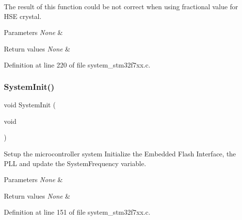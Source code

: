 \begin{DoxyItemize}
\item The result of this function could be not correct when using fractional value for H\+SE crystal.
\end{DoxyItemize}


\begin{DoxyParams}{Parameters}
{\em None} & \\
\hline
\end{DoxyParams}

\begin{DoxyRetVals}{Return values}
{\em None} & \\
\hline
\end{DoxyRetVals}


Definition at line 220 of file system\+\_\+stm32f7xx.\+c.

\mbox{\label{group__STM32F7xx__System__Private__Functions_ga93f514700ccf00d08dbdcff7f1224eb2}} 
\subsubsection{\texorpdfstring{SystemInit()}{SystemInit()}}
{\footnotesize\ttfamily void System\+Init (\begin{DoxyParamCaption}\item[{void}]{ }\end{DoxyParamCaption})}



Setup the microcontroller system Initialize the Embedded Flash Interface, the P\+LL and update the System\+Frequency variable. 


\begin{DoxyParams}{Parameters}
{\em None} & \\
\hline
\end{DoxyParams}

\begin{DoxyRetVals}{Return values}
{\em None} & \\
\hline
\end{DoxyRetVals}


Definition at line 151 of file system\+\_\+stm32f7xx.\+c.

